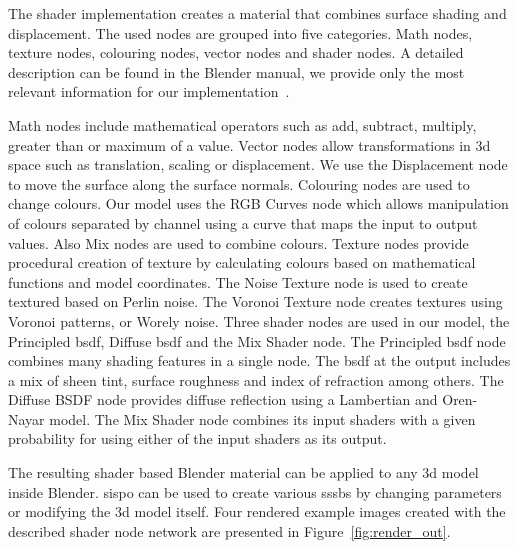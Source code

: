 The shader implementation creates a material that combines surface shading and displacement. The used nodes are grouped into five categories. Math nodes, texture nodes, colouring nodes, vector nodes and shader nodes. A detailed description can be found in the Blender manual, we provide only the most relevant information for our implementation~\cite{IntroductionNodes}.

Math nodes include mathematical operators such as add, subtract, multiply, greater than or maximum of a value. Vector nodes allow transformations in \gls{3d} space such as translation, scaling or displacement. We use the Displacement node to move the surface along the surface normals. Colouring nodes are used to change colours. Our model uses the RGB Curves node which allows manipulation of colours separated by channel using a curve that maps the input to output values. Also Mix nodes are used to combine colours. Texture nodes provide procedural creation of texture by calculating colours based on mathematical functions and model coordinates. The Noise Texture node is used to create textured based on Perlin noise. The Voronoi Texture node creates textures using Voronoi patterns, or Worely noise. Three shader nodes are used in our model, the Principled \gls{bsdf}, Diffuse \gls{bsdf} and the Mix Shader node. The Principled \gls{bsdf} node combines many shading features in a single node. The \gls{bsdf} at the output includes a mix of sheen tint, surface roughness and index of refraction among others. The Diffuse BSDF node provides diffuse reflection using a Lambertian and Oren-Nayar model. The Mix Shader node combines its input shaders with a given probability for using either of the input shaders as its output.

The resulting shader based Blender material can be applied to any \gls{3d} model inside Blender. \Gls{sispo} can be used to create various \glspl{sssb} by changing parameters or modifying the \gls{3d} model itself. Four rendered example images created with the described shader node network are presented in Figure~\ref{fig:render_out}.

